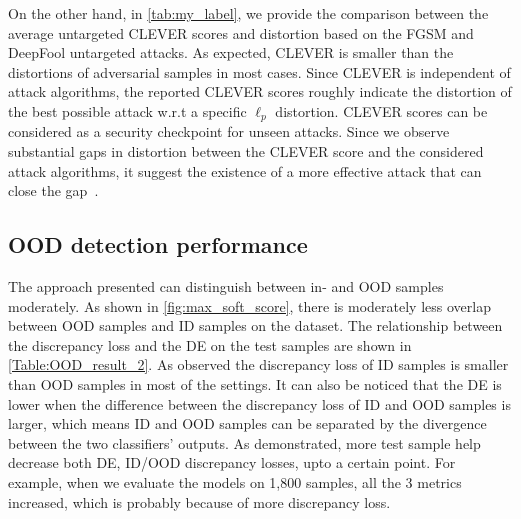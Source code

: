 \hspace*{3.5mm} On the other hand, in \cref{tab:my_label}, we provide the comparison between the average untargeted CLEVER scores and distortion based on the FGSM and DeepFool untargeted attacks. As expected, CLEVER is smaller than the distortions of adversarial samples in most cases. Since CLEVER is independent of attack algorithms, the reported CLEVER scores roughly indicate the distortion of the best possible attack w.r.t a specific $\ell_{p}$ distortion. CLEVER scores can be considered as a security checkpoint for unseen attacks. Since we observe substantial gaps in distortion between the CLEVER score and the considered attack algorithms, it suggest the existence of a more effective attack that can close the gap~\cite{weng2018evaluating}.

\subsection{OOD detection performance}
The approach presented can distinguish between in- and OOD samples moderately. As shown in \cref{fig:max_soft_score}, there is moderately less overlap between OOD samples and ID samples on the dataset. The relationship between the discrepancy loss and the DE on the test samples are shown in \cref{Table:OOD_result_2}. As observed the discrepancy loss of ID samples is smaller than OOD samples in most of the settings. It can also be noticed that the DE is lower when the difference between the discrepancy loss of ID and OOD samples is larger, which means ID and OOD samples can be separated by the divergence between the two classifiers’ outputs. As demonstrated, more test sample help decrease both DE, ID/OOD discrepancy losses, upto a certain point. For example, when we evaluate the models on 1,800 samples, all the 3 metrics increased, which is probably because of more discrepancy loss. 

